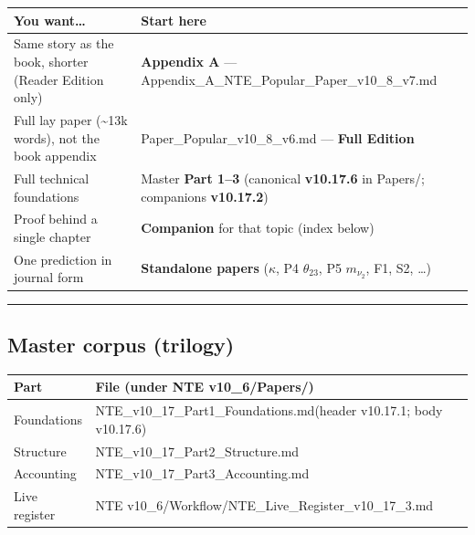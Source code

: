 \documentclass[
  11pt,
]{article}
\newcounter{none} %
\begin{document}
{\def\LTcaptype{none} %
\begin{longtable}[]{@{}
  >{\raggedright\arraybackslash}p{}
  >{\raggedright\arraybackslash}p{}@{}}
\toprule\noalign{}
\begin{minipage}[b]{\linewidth}\raggedright
You want\ldots{}
\end{minipage} & \begin{minipage}[b]{\linewidth}\raggedright
Start here
\end{minipage} \\
\midrule\noalign{}
\endhead
\bottomrule\noalign{}
\endlastfoot
Same story as the book, shorter (Reader Edition only) & \textbf{Appendix
A} --- Appendix\_A\_NTE\_Popular\_Paper\_v10\_8\_v7.md \\
Full lay paper (\textasciitilde13k words), not the book appendix &
Paper\_Popular\_v10\_8\_v6.md --- \textbf{Full Edition} \\
Full technical foundations & Master \textbf{Part 1--3} (canonical
\textbf{v10.17.6} in Papers/; companions \textbf{v10.17.2}) \\
Proof behind a single chapter & \textbf{Companion} for that topic (index
below) \\
One prediction in journal form & \textbf{Standalone papers} (\(\kappa\),
P4 \(\theta_{23}\), P5 \(m_{\nu_2}\), F1, S2, \ldots) \\
\end{longtable}
}

\begin{center}\rule{0.5\linewidth}{0.5pt}\end{center}

\subsection{Master corpus (trilogy)}\label{master-corpus-trilogy}

{\def\LTcaptype{none} %
\begin{longtable}[]{@{}
  >{\raggedright\arraybackslash}p{}
  >{\raggedright\arraybackslash}p{}@{}}
\toprule\noalign{}
\begin{minipage}[b]{\linewidth}\raggedright
Part
\end{minipage} & \begin{minipage}[b]{\linewidth}\raggedright
File (under NTE v10\_6/Papers/)
\end{minipage} \\
\midrule\noalign{}
\endhead
\bottomrule\noalign{}
\endlastfoot
Foundations & NTE\_v10\_17\_Part1\_Foundations.md\newline (header
v10.17.1; body v10.17.6) \\
Structure & NTE\_v10\_17\_Part2\_Structure.md \\
Accounting & NTE\_v10\_17\_Part3\_Accounting.md \\
Live register & NTE
v10\_6/Workflow/NTE\_Live\_Register\_v10\_17\_3.md \\
\end{longtable}
}
\end{document}
